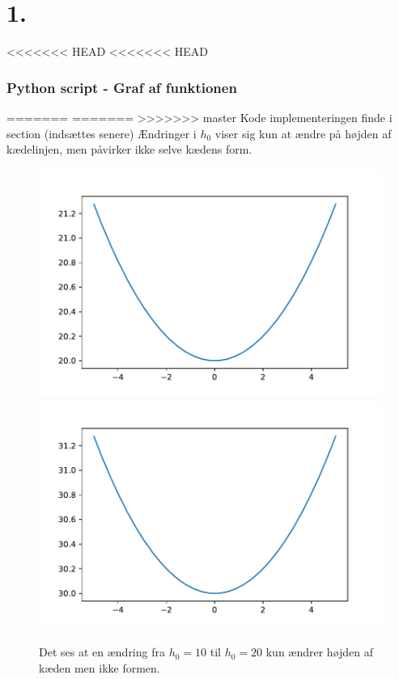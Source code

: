 \section*{1.}
<<<<<<< HEAD
<<<<<<< HEAD
% 
\subsubsection*{Python script - Graf af funktionen}
%

%
=======
=======
>>>>>>> master
Kode implementeringen finde i section (indsættes senere)
% 
Ændringer i $h_0$ viser sig kun at ændre på højden af kædelinjen, men påvirker ikke selve kædens form.

\begin{figure}[h!]
\includegraphics[scale=0.5]{code/fig1}
\includegraphics[scale=0.5]{code/fig2}
\caption{Det ses at en ændring fra $h_0=10$ til $h_0=20$ kun ændrer højden af kæden men ikke formen.}
\end{figure}




